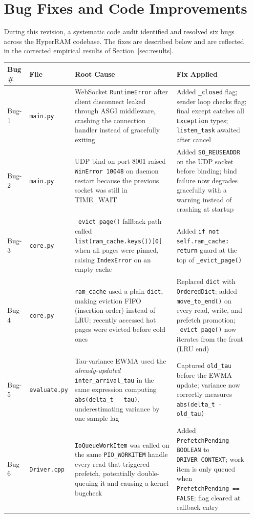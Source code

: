 \documentclass[11pt,a4paper]{article}
\newcommand{\code}[1]{\texttt{#1}}
\begin{document}
\section{Bug Fixes and Code Improvements}
\label{sec:bugfixes}

During this revision, a systematic code audit identified and resolved six bugs across the HyperRAM codebase. The fixes are described below and are reflected in the corrected empirical results of Section~\ref{sec:results}.

\begin{longtable}{p{2.5cm}p{3cm}p{4cm}p{4cm}}
\toprule
\textbf{Bug\,\#} & \textbf{File} & \textbf{Root Cause} & \textbf{Fix Applied} \\
\midrule
\endhead
Bug-1 & \code{main.py} & WebSocket \code{RuntimeError} after client disconnect leaked through ASGI middleware, crashing the connection handler instead of gracefully exiting & Added \code{\_closed} flag; sender loop checks flag; final except catches all \code{Exception} types; \code{listen\_task} awaited after cancel \\
Bug-2 & \code{main.py} & UDP bind on port 8001 raised \code{WinError 10048} on daemon restart because the previous socket was still in TIME\_WAIT & Added \code{SO\_REUSEADDR} on the UDP socket before binding; bind failure now degrades gracefully with a warning instead of crashing at startup \\
Bug-3 & \code{core.py} & \code{\_evict\_page()} fallback path called \code{list(ram\_cache.keys())[0]} when all pages were pinned, raising \code{IndexError} on an empty cache & Added \code{if not self.ram\_cache: return} guard at the top of \code{\_evict\_page()} \\
Bug-4 & \code{core.py} & \code{ram\_cache} used a plain \code{dict}, making eviction FIFO (insertion order) instead of LRU; recently accessed hot pages were evicted before cold ones & Replaced \code{dict} with \code{OrderedDict}; added \code{move\_to\_end()} on every read, write, and prefetch promotion; \code{\_evict\_page()} now iterates from the front (LRU end) \\
Bug-5 & \code{evaluate.py} & Tau-variance EWMA used the \emph{already-updated} \code{inter\_arrival\_tau} in the same expression computing \code{abs(delta\_t - tau)}, underestimating variance by one sample lag & Captured \code{old\_tau} before the EWMA update; variance now correctly measures \code{abs(delta\_t - old\_tau)} \\
Bug-6 & \code{Driver.cpp} & \code{IoQueueWorkItem} was called on the same \code{PIO\_WORKITEM} handle every read that triggered prefetch, potentially double-queuing it and causing a kernel bugcheck & Added \code{PrefetchPending} \code{BOOLEAN} to \code{DRIVER\_CONTEXT}; work item is only queued when \code{PrefetchPending == FALSE}; flag cleared at callback entry \\
\bottomrule
\end{longtable}
\end{document}
